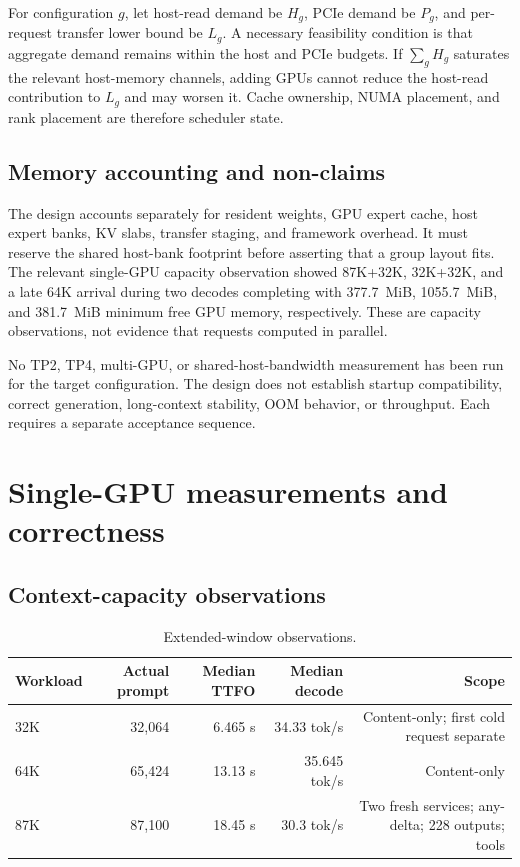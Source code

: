 \documentclass[11pt]{article}
\begin{document}
For configuration $g$, let host-read demand be $H_g$, PCIe demand be $P_g$, and per-request transfer lower bound be $L_g$. A necessary feasibility condition is that aggregate demand remains within the host and PCIe budgets. If $\sum_g H_g$ saturates the relevant host-memory channels, adding GPUs cannot reduce the host-read contribution to $L_g$ and may worsen it. Cache ownership, NUMA placement, and rank placement are therefore scheduler state.

\subsection{Memory accounting and non-claims}

The design accounts separately for resident weights, GPU expert cache, host expert banks, KV slabs, transfer staging, and framework overhead. It must reserve the shared host-bank footprint before asserting that a group layout fits. The relevant single-GPU capacity observation showed 87K+32K, 32K+32K, and a late 64K arrival during two decodes completing with 377.7~MiB, 1055.7~MiB, and 381.7~MiB minimum free GPU memory, respectively. These are capacity observations, not evidence that requests computed in parallel.

No TP2, TP4, multi-GPU, or shared-host-bandwidth measurement has been run for the target configuration. The design does not establish startup compatibility, correct generation, long-context stability, OOM behavior, or throughput. Each requires a separate acceptance sequence.

\section{Single-GPU measurements and correctness}

\subsection{Context-capacity observations}

\begin{table}[t]
\centering
\small
\begin{tabular}{lrrrr}
\toprule
Workload & Actual prompt & Median TTFO & Median decode & Scope \\
\midrule
32K & 32,064 & 6.465 s & 34.33 tok/s & Content-only; first cold request separate \\
64K & 65,424 & 13.13 s & 35.645 tok/s & Content-only \\
87K & 87,100 & 18.45 s & 30.3 tok/s & Two fresh services; any-delta; 228 outputs; tools \\
\bottomrule
\end{tabular}
\caption{Extended-window observations.}
\label{tab:capacity}
\end{table}
\end{document}
